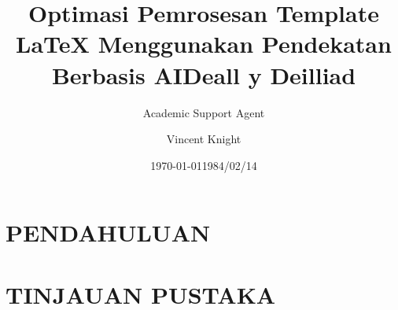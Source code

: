 \documentclass{article}
\title{Optimasi Pemrosesan Template LaTeX Menggunakan Pendekatan Berbasis AI}
\author{Academic Support Agent}
\date{\today}
\begin{document}
\maketitle

\begin{abstract}

\end{abstract}

\chapter{PENDAHULUAN}


\chapter{TINJAUAN PUSTAKA}



\usepackage{fullpage} %
\usepackage{parskip} %
\usepackage{tikz} %
\usepackage{amsmath}
\usepackage{hyperref}


\usepackage{biblatex}

\title{Deall y Deilliad}
\author{Vincent Knight}
\date{1984/02/14}

\renewcommand{\figurename}{Ffigwr} %
\end{document}
